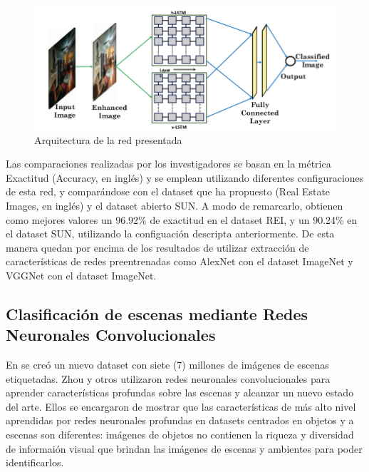 \begin{figure}[h]
	\centering
	\includegraphics[width=1\linewidth,height=0.3\textheight]{images/lstm_architecture}
	\caption[Arquitectura de la red presentada]{Arquitectura de la red presentada}
	\label{fig:lstmarchitecture}
\end{figure}

Las comparaciones realizadas por los investigadores se basan en la métrica Exactitud (Accuracy, en inglés) y se emplean utilizando diferentes configuraciones de esta red, y comparándose con el dataset que ha propuesto (Real Estate Images, en inglés) y el dataset abierto SUN. A modo de remarcarlo, obtienen como mejores valores un 96.92\% de exactitud en el dataset REI, y un 90.24\% en el dataset SUN, utilizando la configuación descripta anteriormente.
De esta manera quedan por encima de los resultados de utilizar extracción de características de redes preentrenadas como AlexNet con el dataset ImageNet y VGGNet con el dataset ImageNet.

 

\subsection{Clasificación de escenas mediante Redes Neuronales Convolucionales}


En \cite{learning_deep_features} se creó un nuevo dataset con siete (7) millones de imágenes de escenas etiquetadas. Zhou y otros utilizaron redes neuronales convolucionales para aprender características profundas sobre las escenas y alcanzar un nuevo estado del arte. Ellos se encargaron de mostrar que las características de más alto nivel aprendidas por redes neuronales profundas en datasets centrados en objetos y a escenas son diferentes: imágenes de objetos no contienen la riqueza y diversidad de informaión visual que brindan las imágenes de escenas y ambientes para poder identificarlos.

